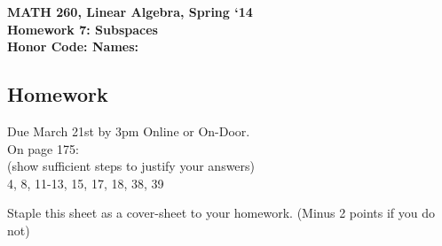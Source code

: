 \documentclass{article}
\begin{document}
\begin{flushleft}
	\bfseries{MATH 260, Linear Algebra, Spring `14}\\
	\bfseries{Homework 7:  Subspaces}\\
	\bfseries{Honor Code:} \hspace{3.5in}\bfseries{\LARGE Names:}\\
\end{flushleft}
\begin{flushleft}
\vspace{.5in}
\normalsize
\section*{Homework}
\LARGE Due March 21st by 3pm Online or On-Door.\\
\normalsize
\vspace{0.25in}
On page 175:\\
(show sufficient steps to justify your answers)\\
4, 8, 11-13, 15, 17, 18, 38, 39\\
\vspace{0.5in}


\vspace{1in}
\Large
Staple this sheet as a cover-sheet to your homework. (Minus 2 points if you do not)
\end{flushleft}
\end{document}
